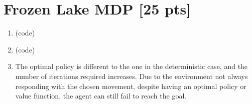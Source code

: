 \documentclass[11pt]{article}
\begin{document}
\begin{enumerate}[label=(\alph*)]
\end{enumerate}

\section{Frozen Lake MDP [25 pts]}

\begin{enumerate}[label=(\alph*)]

\item (code)
\item (code)
\item The optimal policy is different to the one in the deterministic case, and the number of iterations required increases. Due to the environment not always responding with the chosen movement, despite having an optimal policy or value function, the agent can still fail to reach the goal.
	
\end{enumerate}
\end{document}
